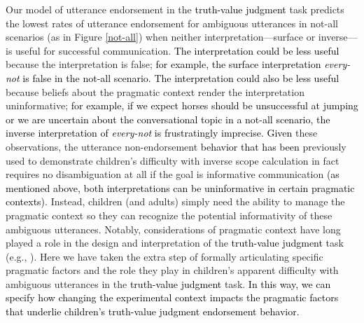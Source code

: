 \documentclass[cm]{glossa}
\newcommand{\lp}[1]{\textcolor{black}{#1}} %
\begin{document}
Our model of utterance endorsement in the %
\lp{truth-value judgment}
task predicts the lowest rates of utterance endorsement for ambiguous utterances in not-all  scenarios (as in Figure \ref{not-all})
when neither interpretation---surface or inverse---is useful for successful communication.
\lp{The interpretation could be less useful}
 because the interpretation is false;  
\lp{for example, the surface interpretation \emph{every-not} is false in the not-all scenario.}
\lp{The interpretation could also be less useful} 
because beliefs about the pragmatic context render the interpretation uninformative;
\lp{for example, if we 
expect horses should be unsuccessful at jumping 
or 
we are uncertain about the conversational topic in a not-all scenario,
the inverse interpretation of \emph{every-not} %
is frustratingly imprecise.
} 
\lp{Given} these observations, 
 the utterance non-endorsement \lp{behavior} \lp{that has been} previously used to demonstrate children's difficulty with {inverse} scope calculation in fact requires no disambiguation at all if the goal is informative communication \lp{(as mentioned above, both interpretations can be uninformative in certain pragmatic contexts)}. Instead, children (and adults) simply need the ability to manage the pragmatic context so they can recognize the potential informativity of these ambiguous utterances. Notably, considerations of pragmatic context have long played a role in the design and interpretation of the 
 \lp{truth-value judgment}
 task (e.g., \citealp{crainetal1996}). Here we have taken the extra step of formally articulating specific pragmatic factors and the role they play in children's apparent difficulty with ambiguous utterances in the
 \lp{truth-value judgment}
 task.
 \lp{In this way, we can specify how changing the experimental context impacts the pragmatic factors that underlie children's truth-value judgment endorsement behavior.}
\end{document}
